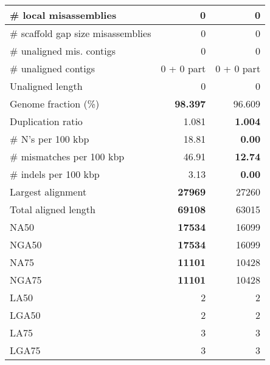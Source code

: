 \documentclass[12pt,a4paper]{article}
\begin{document}
\begin{table}[ht]
\begin{center}
\begin{tabular}{|l*{2}{|r}|}
\# local misassemblies & 0 & 0 \\ \hline
\# scaffold gap size misassemblies & 0 & 0 \\ \hline
\# unaligned mis. contigs & 0 & 0 \\ \hline
\# unaligned contigs & 0 + 0 part & 0 + 0 part \\ \hline
Unaligned length & 0 & 0 \\ \hline
Genome fraction (\%) & {\bf 98.397} & 96.609 \\ \hline
Duplication ratio & 1.081 & {\bf 1.004} \\ \hline
\# N's per 100 kbp & 18.81 & {\bf 0.00} \\ \hline
\# mismatches per 100 kbp & 46.91 & {\bf 12.74} \\ \hline
\# indels per 100 kbp & 3.13 & {\bf 0.00} \\ \hline
Largest alignment & {\bf 27969} & 27260 \\ \hline
Total aligned length & {\bf 69108} & 63015 \\ \hline
NA50 & {\bf 17534} & 16099 \\ \hline
NGA50 & {\bf 17534} & 16099 \\ \hline
NA75 & {\bf 11101} & 10428 \\ \hline
NGA75 & {\bf 11101} & 10428 \\ \hline
LA50 & 2 & 2 \\ \hline
LGA50 & 2 & 2 \\ \hline
LA75 & 3 & 3 \\ \hline
LGA75 & 3 & 3 \\ \hline
\end{tabular}
\end{center}
\end{table}
\end{document}
